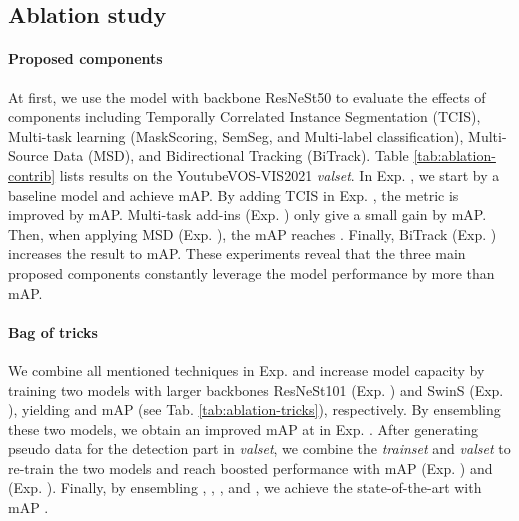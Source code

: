 \documentclass[10pt,twocolumn,letterpaper]{article}
\begin{document}
\subsection{Ablation study}
\label{sec:ablation}

\paragraph{Proposed components} At first, we use the model with backbone ResNeSt50 to evaluate the effects of components including Temporally Correlated Instance Segmentation (TCIS), Multi-task learning (MaskScoring, SemSeg, and Multi-label classification), Multi-Source Data (MSD), and Bidirectional Tracking (BiTrack). Table \ref{tab:ablation-contrib} lists results on the YoutubeVOS-VIS2021 \textit{valset}. In Exp. , we start by a baseline model and achieve  mAP. By adding TCIS in Exp. , the metric is improved by  mAP. Multi-task add-ins (Exp. ) only give a small gain by  mAP. Then, when applying MSD (Exp. ), the mAP reaches . Finally, BiTrack (Exp. ) increases the result to  mAP. These experiments reveal that the three main proposed components constantly leverage the model performance by more than  mAP.

\paragraph{Bag of tricks} We combine all mentioned techniques in Exp.  and increase model capacity by training two models with larger backbones ResNeSt101 (Exp. ) and SwinS (Exp. ), yielding  and  mAP (see Tab. \ref{tab:ablation-tricks}), respectively. By ensembling these two models, we obtain an improved mAP at  in Exp. . After generating pseudo data for the detection part in \textit{valset}, we combine the \textit{trainset} and \textit{valset} to re-train the two models and reach boosted performance with mAP  (Exp. ) and  (Exp. ). Finally, by ensembling , , , and , we achieve the state-of-the-art with mAP .
\end{document}
